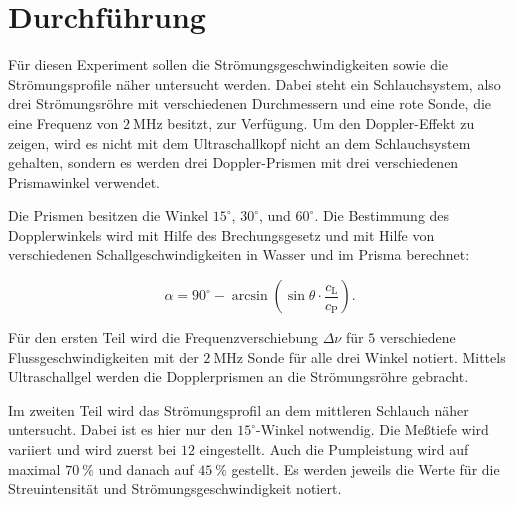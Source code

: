 \section{Durchführung}
\label{sec:Durchführung}
Für diesen Experiment sollen die Strömungsgeschwindigkeiten sowie die Strömungsprofile näher untersucht werden. Dabei steht ein Schlauchsystem, also drei Strömungsröhre mit verschiedenen Durchmessern und eine rote Sonde, die eine Frequenz von $\SI{2}{\mega\hertz}$ besitzt, zur Verfügung. Um den Doppler-Effekt zu zeigen, wird es nicht mit dem Ultraschallkopf nicht an dem Schlauchsystem gehalten, sondern es werden drei Doppler-Prismen mit drei verschiedenen Prismawinkel verwendet.

Die Prismen besitzen die Winkel $15 ^\circ$, $30 ^\circ$, und $60 ^\circ$. Die Bestimmung des Dopplerwinkels wird mit Hilfe des Brechungsgesetz und mit Hilfe von verschiedenen Schallgeschwindigkeiten in Wasser und im Prisma berechnet:

\begin{equation}
\alpha = 90^\circ - \arcsin\left(\sin\theta\cdot\frac{c_\text{L}}{c_\text{P}}\right).
\end{equation}

Für den ersten Teil wird die Frequenzverschiebung $\Delta\nu$ für $5$ verschiedene Flussgeschwindigkeiten mit der $\SI{2}{\mega\hertz}$ Sonde für alle drei Winkel notiert. Mittels Ultraschallgel werden die Dopplerprismen an die Strömungsröhre gebracht. 

Im zweiten Teil wird das Strömungsprofil an dem mittleren Schlauch näher untersucht. Dabei ist es hier nur den $15 ^\circ$-Winkel notwendig. Die Meßtiefe wird variiert und wird zuerst bei $12$ eingestellt. Auch die Pumpleistung wird auf maximal $\SI{70}{\percent}$ und danach auf $\SI{45}{\percent}$ gestellt. Es werden jeweils die Werte für die Streuintensität und Strömungsgeschwindigkeit notiert. 